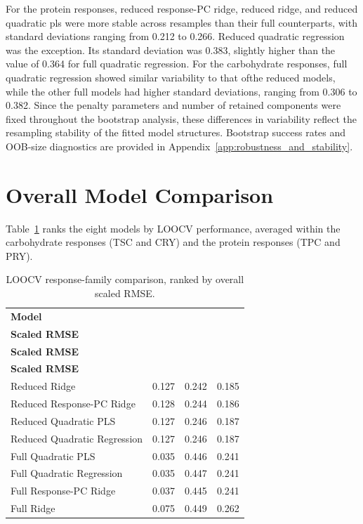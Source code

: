 \documentclass[MScDSA]{uccthesis}
\begin{document}
For the protein responses, reduced response-PC ridge, reduced ridge, and reduced quadratic pls were more stable across resamples than their full counterparts, with standard deviations ranging from 0.212 to 0.266. Reduced quadratic regression was the exception. Its standard deviation was 0.383, slightly higher than the value of 0.364 for full quadratic regression. For the carbohydrate responses, full quadratic regression showed similar variability to that ofthe reduced models, while the other full models had higher standard deviations, ranging from 0.306 to 0.382. Since the penalty parameters and number of retained components were fixed throughout the bootstrap analysis, these differences in variability reflect the resampling stability of the fitted model structures. Bootstrap success rates and OOB-size diagnostics are provided in Appendix~\ref{app:robustness_and_stability}.

\section{Overall Model Comparison}
Table~\ref{tab:loocv_response_family} ranks the eight models by LOOCV performance, averaged within the carbohydrate responses (TSC and CRY) and the protein responses (TPC and PRY).


\begin{table}[H]
\centering
\fontsize{10}{12}\selectfont
\setlength{\tabcolsep}{4pt}
\caption{LOOCV response-family comparison, ranked by overall scaled RMSE.}
\label{tab:loocv_response_family}
\begin{tabular}{lccc}
\toprule
\textbf{Model} & \makecell{\textbf{Carb.}\\\textbf{Scaled RMSE}} & \makecell{\textbf{Protein}\\\textbf{Scaled RMSE}} & \makecell{\textbf{Overall}\\\textbf{Scaled RMSE}} \\
\midrule
Reduced Ridge & 0.127 & 0.242 & 0.185 \\
Reduced Response-PC Ridge & 0.128 & 0.244 & 0.186 \\
Reduced Quadratic PLS & 0.127 & 0.246 & 0.187 \\
Reduced Quadratic Regression & 0.127  & 0.246 & 0.187 \\
Full Quadratic PLS & 0.035 & 0.446 & 0.241 \\
Full Quadratic Regression & 0.035 & 0.447 & 0.241 \\
Full Response-PC Ridge & 0.037 & 0.445 & 0.241 \\
Full Ridge & 0.075 & 0.449 & 0.262 \\
\bottomrule
\end{tabular}
\end{table}
\end{document}
